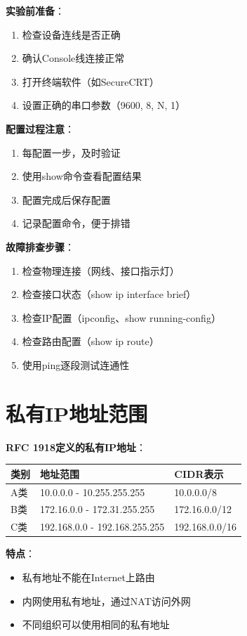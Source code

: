 \documentclass[12pt,a4paper]{ctexart}
\begin{document}
\begin{keybox}
\textbf{实验前准备}：
\begin{enumerate}[itemsep=0pt]
    \item 检查设备连线是否正确
    \item 确认Console线连接正常
    \item 打开终端软件（如SecureCRT）
    \item 设置正确的串口参数（9600, 8, N, 1）
\end{enumerate}

\textbf{配置过程注意}：
\begin{enumerate}[itemsep=0pt]
    \item 每配置一步，及时验证
    \item 使用show命令查看配置结果
    \item 配置完成后保存配置
    \item 记录配置命令，便于排错
\end{enumerate}

\textbf{故障排查步骤}：
\begin{enumerate}[itemsep=0pt]
    \item 检查物理连接（网线、接口指示灯）
    \item 检查接口状态（show ip interface brief）
    \item 检查IP配置（ipconfig、show running-config）
    \item 检查路由配置（show ip route）
    \item 使用ping逐段测试连通性
\end{enumerate}
\end{keybox}

\section{私有IP地址范围}

\begin{keybox}
\textbf{RFC 1918定义的私有IP地址}：

\begin{center}
\begin{tabular}{lll}
\toprule
\textbf{类别} & \textbf{地址范围} & \textbf{CIDR表示} \\
\midrule
A类 & 10.0.0.0 - 10.255.255.255 & 10.0.0.0/8 \\
B类 & 172.16.0.0 - 172.31.255.255 & 172.16.0.0/12 \\
C类 & 192.168.0.0 - 192.168.255.255 & 192.168.0.0/16 \\
\bottomrule
\end{tabular}
\end{center}

\textbf{特点}：
\begin{itemize}[itemsep=0pt]
    \item 私有地址不能在Internet上路由
    \item 内网使用私有地址，通过NAT访问外网
    \item 不同组织可以使用相同的私有地址
\end{itemize}
\end{keybox}
\end{document}
